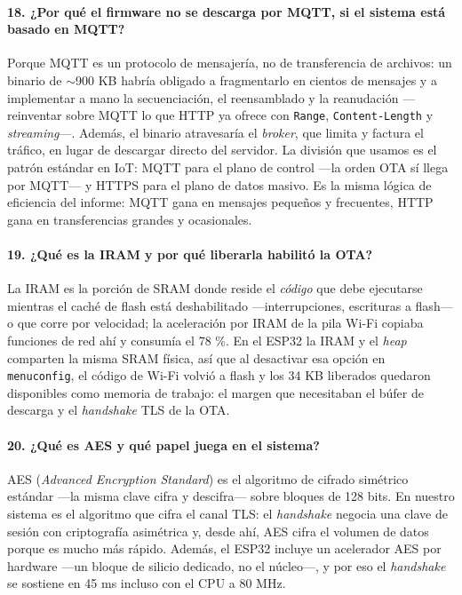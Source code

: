 \documentclass[11pt, a4paper]{article}
\begin{document}
\paragraph{18. ¿Por qué el firmware no se descarga por MQTT, si el sistema está basado en MQTT?}
Porque MQTT es un protocolo de mensajería, no de transferencia de archivos: un binario de $\sim$900 KB habría obligado a fragmentarlo en cientos de mensajes y a implementar a mano la secuenciación, el reensamblado y la reanudación —reinventar sobre MQTT lo que HTTP ya ofrece con \texttt{Range}, \texttt{Content-Length} y \textit{streaming}—. Además, el binario atravesaría el \textit{broker}, que limita y factura el tráfico, en lugar de descargar directo del servidor. La división que usamos es el patrón estándar en IoT: MQTT para el plano de control —la orden OTA sí llega por MQTT— y HTTPS para el plano de datos masivo. Es la misma lógica de eficiencia del informe: MQTT gana en mensajes pequeños y frecuentes, HTTP gana en transferencias grandes y ocasionales.

\paragraph{19. ¿Qué es la IRAM y por qué liberarla habilitó la OTA?}
La IRAM es la porción de SRAM donde reside el \textit{código} que debe ejecutarse mientras el caché de flash está deshabilitado —interrupciones, escrituras a flash— o que corre por velocidad; la aceleración por IRAM de la pila Wi-Fi copiaba funciones de red ahí y consumía el 78 \%. En el ESP32 la IRAM y el \textit{heap} comparten la misma SRAM física, así que al desactivar esa opción en \texttt{menuconfig}, el código de Wi-Fi volvió a flash y los 34 KB liberados quedaron disponibles como memoria de trabajo: el margen que necesitaban el búfer de descarga y el \textit{handshake} TLS de la OTA.

\paragraph{20. ¿Qué es AES y qué papel juega en el sistema?}
AES (\textit{Advanced Encryption Standard}) es el algoritmo de cifrado simétrico estándar —la misma clave cifra y descifra— sobre bloques de 128 bits. En nuestro sistema es el algoritmo que cifra el canal TLS: el \textit{handshake} negocia una clave de sesión con criptografía asimétrica y, desde ahí, AES cifra el volumen de datos porque es mucho más rápido. Además, el ESP32 incluye un acelerador AES por hardware —un bloque de silicio dedicado, no el núcleo—, y por eso el \textit{handshake} se sostiene en 45 ms incluso con el CPU a 80 MHz.
\end{document}
